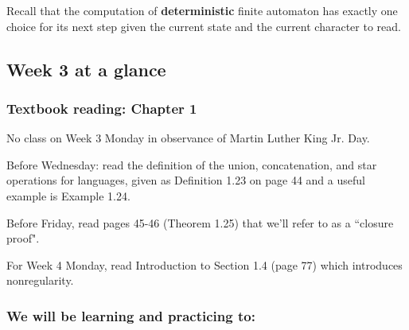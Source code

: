 Recall that the computation of {\bf deterministic} finite automaton has exactly one choice for its next step given the current state and the current character to read.






\newpage

\subsection*{Week 3 at a glance}


\subsubsection*{Textbook reading: Chapter 1}

\vspace{-15pt}

No class on Week 3 Monday in observance of Martin Luther King Jr. Day.

Before Wednesday: read the definition of the union, concatenation, and star operations for languages,  given 
as Definition 1.23 on page 44 and a useful example is Example 1.24.

Before Friday,  read pages 45-46 (Theorem 1.25) that we'll refer to as a ``closure proof".

For Week 4 Monday, read Introduction to Section 1.4 (page 77) which introduces nonregularity.


\vspace{-20pt}

\subsubsection*{We will be learning and practicing to:}

\vspace{-15pt}

